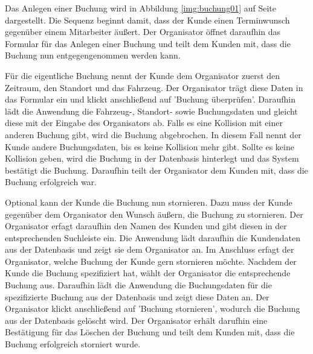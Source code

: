 Das Anlegen einer Buchung wird in Abbildung \ref{img:buchung01} auf Seite \pageref{img:buchung01} dargestellt. Die Sequenz beginnt damit, dass der Kunde einen Terminwunsch gegenüber einem Mitarbeiter äußert. Der Organisator öffnet daraufhin das Formular für das Anlegen einer Buchung und teilt dem Kunden mit, dass die Buchung nun entgegengenommen werden kann.

Für die eigentliche Buchung nennt der Kunde dem Organisator zuerst den Zeitraum, den Standort und das Fahrzeug. Der Organisator trägt diese Daten in das Formular ein und klickt anschließend auf 'Buchung überprüfen'. Daraufhin lädt die Anwendung die Fahrzeug-, Standort- sowie Buchungsdaten und gleicht diese mit der Eingabe des Organisators ab. Falls es eine Kollision mit einer anderen Buchung gibt, wird die Buchung abgebrochen. In diesem Fall nennt der Kunde andere Buchungsdaten, bis es keine Kollision mehr gibt. Sollte es keine Kollision geben, wird die Buchung in der Datenbasis hinterlegt und das System bestätigt die Buchung. Daraufhin teilt der Organisator dem Kunden mit, dass die Buchung erfolgreich war.

Optional kann der Kunde die Buchung nun stornieren. Dazu muss der Kunde gegenüber dem Organisator den Wunsch äußern, die Buchung zu stornieren. Der Organisator erfagt daraufhin den Namen des Kunden und gibt diesen in der entsprechenden Suchleiste ein. Die Anwendung lädt daraufhin die Kundendaten aus der Datenbasis und zeigt sie dem Organisator an. Im Anschluss erfagt der Organisator, welche Buchung der Kunde gern stornieren möchte. Nachdem der Kunde die Buchung spezifiziert hat, wählt der Organisator die entsprechende Buchung aus. Daraufhin lädt die Anwendung die Buchungsdaten für die spezifizierte Buchung aus der Datenbasis und zeigt diese Daten an. Der Organisator klickt anschließend auf 'Buchung stornieren', wodurch die Buchung aus der Datenbasis gelöscht wird. Der Organisator erhält darufhin eine Bestätigung für das Löschen der Buchung und teilt dem Kunden mit, dass die Buchung erfolgreich storniert wurde. 

\newpage

